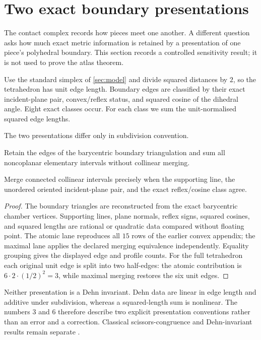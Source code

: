 \section{Two exact boundary presentations}\label{sec:boundary}

The contact complex records how pieces meet one another.  A different
question asks how much exact metric information is retained by a presentation
of one piece's polyhedral boundary.  This section records a controlled
sensitivity result; it is not used to prove the atlas theorem.

Use the standard simplex of \cref{sec:model} and divide squared distances by
$2$, so the tetrahedron has unit edge length.  Boundary edges are classified
by their exact incident-plane pair, convex/reflex status, and squared cosine
of the dihedral angle.  Eight exact classes occur.  For each class we sum the
unit-normalised squared edge lengths.

The two presentations differ only in subdivision convention.
\begin{description}[leftmargin=2.7em,style=nextline]
\item[Atomic presentation.]
Retain the edges of the barycentric boundary triangulation and sum all
noncoplanar elementary intervals without collinear merging.
\item[Maximal-reflex presentation.]
Merge connected collinear intervals precisely when the supporting line, the
unordered oriented incident-plane pair, and the exact reflex/cosine class
agree.
\end{description}

\begin{proof}
The boundary triangles are reconstructed from the exact barycentric chamber
vertices.  Supporting lines, plane normals, reflex signs, squared cosines,
and squared lengths are rational or quadratic data compared without floating
point.  The atomic lane reproduces all $15$ rows of the earlier convex
appendix; the maximal lane applies the declared merging equivalence
independently.  Equality grouping gives the displayed edge and profile
counts.  For the full tetrahedron each original unit edge is split into two
half-edges: the atomic contribution is
$6\cdot2\cdot(1/2)^2=3$, while maximal merging restores the six unit edges.
\end{proof}

Neither presentation is a Dehn invariant.  Dehn data are linear in edge
length and additive under subdivision, whereas a squared-length sum is
nonlinear.  The numbers $3$ and $6$ therefore describe two explicit
presentation conventions rather than an error and a correction.  Classical
scissors-congruence and Dehn-invariant results remain separate
\cite{Sydler1965}.
